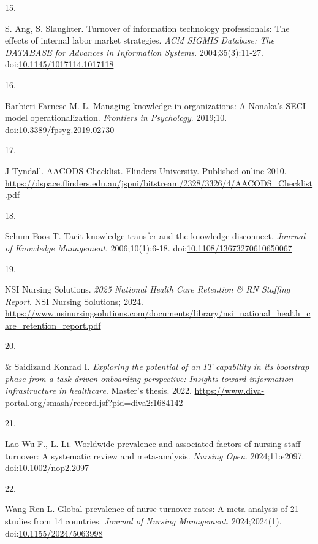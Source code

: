 \documentclass[
  american,
  11pt,
  letterpaper,
  oneside  ,captions=tableheading
]{scrartcl}
\newlength{\cslhangindent}
\newlength{\csllabelwidth}
\newenvironment{CSLReferences}[2] %
 {\begin{list}{}{%
  \setlength{\itemindent}{0pt}
  \setlength{\leftmargin}{0pt}
  \setlength{\parsep}{0pt}
  \ifodd #1
   \setlength{\leftmargin}{\cslhangindent}
   \setlength{\itemindent}{-1\cslhangindent}
  \fi
  \setlength{\itemsep}{#2\baselineskip}}}
 {\end{list}}
\newcommand{\CSLLeftMargin}[1]{\parbox[t]{\csllabelwidth}{\strut#1\strut}}
\newcommand{\CSLRightInline}[1]{\parbox[t]{\linewidth - \csllabelwidth}{\strut#1\strut}}
\begin{document}
\begin{CSLReferences}{0}{1}
\CSLLeftMargin{15. }%
\CSLRightInline{S. Ang, S. Slaughter. {Turnover of information
technology professionals: The effects of internal labor market
strategies}. \emph{{ACM} {SIGMIS} Database: The {DATABASE} for Advances
in Information Systems}. 2004;35(3):11-27.
doi:\href{https://doi.org/10.1145/1017114.1017118}{10.1145/1017114.1017118}}

\CSLLeftMargin{16. }%
\CSLRightInline{Barbieri Farnese M. L. {Managing knowledge in
organizations: A Nonaka's {SECI} model operationalization}.
\emph{Frontiers in Psychology}. 2019;10.
doi:\href{https://doi.org/10.3389/fpsyg.2019.02730}{10.3389/fpsyg.2019.02730}}

\CSLLeftMargin{17. }%
\CSLRightInline{J Tyndall. {{AACODS} Checklist. Flinders University}.
Published online 2010.
\url{https://dspace.flinders.edu.au/jspui/bitstream/2328/3326/4/AACODS_Checklist.pdf}}

\CSLLeftMargin{18. }%
\CSLRightInline{Schum Foos T. {Tacit knowledge transfer and the
knowledge disconnect}. \emph{Journal of Knowledge Management}.
2006;10(1):6-18.
doi:\href{https://doi.org/10.1108/13673270610650067}{10.1108/13673270610650067}}

\CSLLeftMargin{19. }%
\CSLRightInline{NSI Nursing Solutions. \emph{{2025 National Health Care
Retention \& RN Staffing Report}}. NSI Nursing Solutions; 2024.
\url{https://www.nsinursingsolutions.com/documents/library/nsi_national_health_care_retention_report.pdf}}

\CSLLeftMargin{20. }%
\CSLRightInline{\& Saidizand Konrad I. \emph{{Exploring the potential of
an {IT} capability in its bootstrap phase from a task driven onboarding
perspective: Insights toward information infrastructure in healthcare}}.
Master's thesis. 2022.
\url{https://www.diva-portal.org/smash/record.jsf?pid=diva2:1684142}}

\CSLLeftMargin{21. }%
\CSLRightInline{Lao Wu F., L. Li. {Worldwide prevalence and associated
factors of nursing staff turnover: A systematic review and
meta-analysis}. \emph{Nursing Open}. 2024;11:e2097.
doi:\href{https://doi.org/10.1002/nop2.2097}{10.1002/nop2.2097}}

\CSLLeftMargin{22. }%
\CSLRightInline{Wang Ren L. {Global prevalence of nurse turnover rates:
A meta-analysis of 21 studies from 14 countries}. \emph{Journal of
Nursing Management}. 2024;2024(1).
doi:\href{https://doi.org/10.1155/2024/5063998}{10.1155/2024/5063998}}


\end{CSLReferences}
\end{document}
